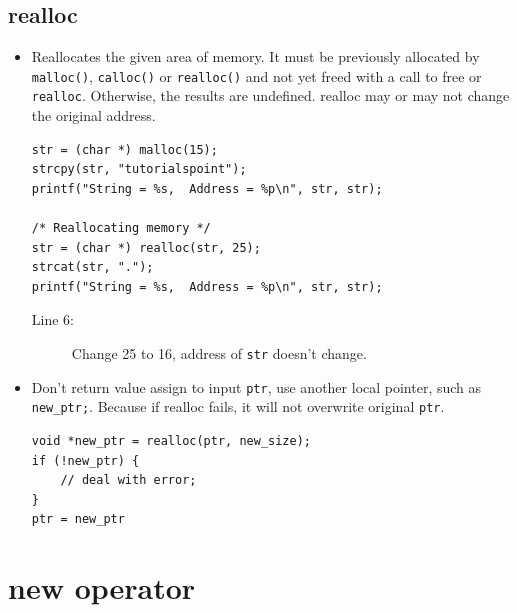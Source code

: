 \documentclass[a4paper,11pt,twoside]{book}
\begin{document}
\subsection{realloc}
\begin{itemize}
	
	\item Reallocates the given area of memory. It must be previously allocated by \texttt{malloc()}, \texttt{calloc()} or \texttt{realloc()} and not yet freed with a call to free or \texttt{realloc}. Otherwise, the results are undefined. realloc may or may not change the original address. 

\begin{lstlisting}[]
str = (char *) malloc(15);
strcpy(str, "tutorialspoint");
printf("String = %s,  Address = %p\n", str, str);

/* Reallocating memory */
str = (char *) realloc(str, 25);
strcat(str, ".");
printf("String = %s,  Address = %p\n", str, str);
\end{lstlisting}
\begin{description}
	\item[Line 6:] Change 25 to 16, address of \texttt{str} doesn't change.
\end{description}

	
	
	\item Don't return value assign to input \texttt{ptr}, use another local pointer, such as \texttt{new\_ptr;}. Because if realloc fails, it will not overwrite original \texttt{ptr}.
\begin{lstlisting}[numbers=none]
void *new_ptr = realloc(ptr, new_size);
if (!new_ptr) {
	// deal with error;
}
ptr = new_ptr
\end{lstlisting}
\end{itemize}


\section{new operator}
\end{document}

